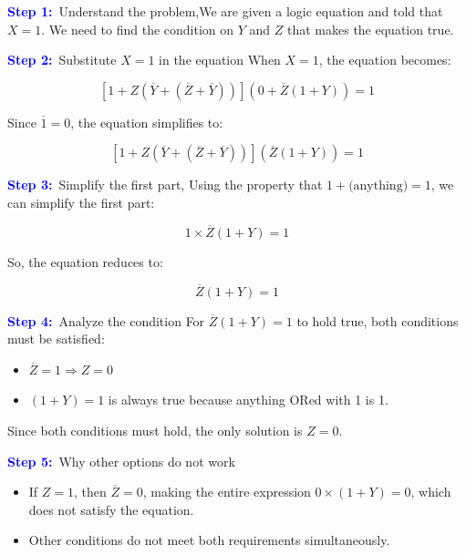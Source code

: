 \documentclass[a4paper,12pt]{article}
\begin{document}
{\hspace{0.5cm}\textbf{\textcolor{blue}{Step 1:}}\
Understand the problem,We are given a logic equation and told that $X = 1$. We need to find the condition on $Y$ and $Z$ that makes the equation true.

\vspace{0.3cm}

\textbf{\textcolor{blue}{Step 2:}}\
 Substitute $X = 1$ in the equation When $X = 1$, the equation becomes:

\[
\left[ 1 + Z \left( \overline{Y} + (\overline{Z} + \overline{Y}) \right) \right] \left( 0 + \overline{Z}(1 + Y) \right) = 1
\]

Since $\overline{1} = 0$, the equation simplifies to:

\[
\left[ 1 + Z \left( \overline{Y} + (\overline{Z} + \overline{Y}) \right) \right] \left( \overline{Z}(1 + Y) \right) = 1
\]

\vspace{0.3cm}

\textbf{\textcolor{blue}{Step 3:}}\
 Simplify the first part, Using the property that $1 + \text{(anything)} = 1$, we can simplify the first part:

\[
1 \times \overline{Z}(1 + Y) = 1
\]

So, the equation reduces to:

\[
\overline{Z}(1 + Y) = 1
\]

\vspace{0.3cm}

\textbf{\textcolor{blue}{Step 4:}}\
Analyze the condition
For $\overline{Z}(1 + Y) = 1$ to hold true, both conditions must be satisfied:

\begin{itemize}
    \item $\overline{Z} = 1 \Rightarrow Z = 0$
    \item $(1 + Y) = 1$ is always true because anything ORed with 1 is 1.
\end{itemize}

Since both conditions must hold, the only solution is $Z = 0$.

\vspace{0.3cm}

\textbf{\textcolor{blue}{Step 5:}}\
Why other options do not work
\begin{itemize}
    \item If $Z = 1$, then $\overline{Z} = 0$, making the entire expression $0 \times (1 + Y) = 0$, which does not satisfy the equation.
    \item Other conditions do not meet both requirements simultaneously.
\end{itemize}

}
\end{document}
